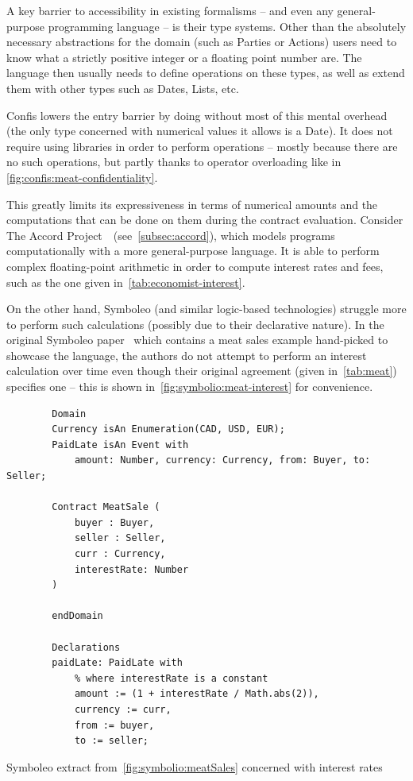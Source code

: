 A key barrier to accessibility in existing formalisms -- and even any general-purpose programming language -- is their type systems.
Other than the absolutely necessary abstractions for the domain (such as Parties or Actions) users need to know what a strictly positive integer or a floating point number are.
The language then usually needs to define operations on these types, as well as extend them with other types such as Dates, Lists, etc.

Confis lowers the entry barrier by doing without most of this mental overhead (the only type concerned with numerical values it allows is a Date).
It does not require using libraries in order to perform operations -- mostly because there are no such operations, but partly thanks to operator overloading like in \autoref{fig:confis:meat-confidentiality}.

This greatly limits its expressiveness in terms of numerical amounts and the computations that can be done on them during the contract evaluation.
Consider The Accord Project~\cite{accordHomepage}~(see~\autoref{subsec:accord}), which models programs computationally with a more general-purpose language.
It is able to perform complex floating-point arithmetic in order to compute interest rates and fees, such as the one given in~\autoref{tab:economist-interest}.

On the other hand, Symboleo (and similar logic-based technologies) struggle more to perform such calculations (possibly due to their declarative nature).
In the original Symboleo paper~\cite{symboleo2020} which contains a meat sales example hand-picked to showcase the language, the authors do not attempt to perform an interest calculation over time even though their original agreement (given in~\autoref{tab:meat}) specifies one -- this is shown in~\autoref{fig:symbolio:meat-interest} for convenience.

\begin{listing}[h]
    \centering
    \begin{minipage}{0.85\textwidth}
        \begin{verbatim}
        Domain
        Currency isAn Enumeration(CAD, USD, EUR);
        PaidLate isAn Event with
            amount: Number, currency: Currency, from: Buyer, to: Seller;

        Contract MeatSale (
            buyer : Buyer,
            seller : Seller,
            curr : Currency,
            interestRate: Number
        )

        endDomain

        Declarations
        paidLate: PaidLate with
            % where interestRate is a constant
            amount := (1 + interestRate / Math.abs(2)),
            currency := curr,
            from := buyer,
            to := seller;
        \end{verbatim}
    \end{minipage}
    \caption{Symboleo extract from~\autoref{fig:symbolio:meatSales} concerned with interest rates}
    \label{fig:symbolio:meat-interest}
\end{listing}

